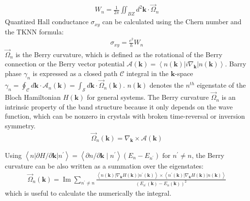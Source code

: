 \begin{align}
	W_{n}=\frac{1}{2 \pi} \iint_{B Z} d ^{2} \boldsymbol{k} \cdot \vec{\Omega}_{n}
\end{align}
Quantized Hall conductance $\sigma_{xy}$ can be calculated using the Chern number and the TKNN formula\cite{thouless1982quantized}:
\begin{align}
	\sigma_{xy}=\frac{e^2}{h}W_n
\end{align}
$\vec{\Omega}_n$ is the Berry curvature, which is defined as the rotational of the Berry connection or the
Berry vector potential $\mathcal{A}(\boldsymbol{k})=\left\langle n(\boldsymbol{k})\left|i \nabla_{\boldsymbol{k}}\right|n(\boldsymbol{k})\right\rangle
$\cite{berry1984quantal}. Barry phase $\gamma_n$ is expressed as a closed path $\mathcal{C}$ integral in the $\boldsymbol{k}$-space $\gamma_{n}=\oint_{\mathcal{C}} d \boldsymbol{k} \cdot \mathcal{A}_{n}(\boldsymbol{k})=\int_{\mathcal{S}} d \boldsymbol{k} \cdot \vec{\Omega}_{n}(\boldsymbol{k})$.
$n(\boldsymbol{k})$ denotes the $n^{th}$ eigenstate of the Bloch
Hamiltonian $H(\boldsymbol{k})$ for general systems. The Berry curvature $\vec{\Omega}_n$ is an intrinsic property of the
band structure because it only depends on the wave
function, which can be nonzero in crystals with broken time-reversal or inversion symmetry.\cite{xiao2010berry}
\begin{align}
	\vec{\Omega}_{n}(\boldsymbol{k})=\nabla_{\boldsymbol{k}} \times\mathcal{A}(\boldsymbol{k})
\end{align}

Using $\left\langle n|\partial H / \partial \boldsymbol{k}| n^{\prime}\right\rangle=\left\langle\partial n / \partial \boldsymbol{k} \mid n^{\prime}\right\rangle\left(E_{n}-E_{n^{\prime}}\right) \text { for } n^{\prime} \neq n$, the Berry curvature can be also written as a summation over the eigenstates:
\begin{align}
	\vec{\Omega}_{n}(\boldsymbol{k})=\operatorname{Im} \sum_{n^\prime \neq n} \frac{\left\langle n(\boldsymbol{k})\left|\nabla_{\boldsymbol{k}} H(\boldsymbol{k})\right| n^\prime(\boldsymbol{k})\right\rangle \times\left\langle n^\prime(\boldsymbol{k})\left|\nabla_{\boldsymbol{k}} H(\boldsymbol{k})\right| n(\boldsymbol{k})\right\rangle}{\left(E_{n^\prime}(\boldsymbol{k})-E_{n}(\boldsymbol{k})\right)^{2}}
\end{align}
which is useful to calculate the numerically the integral.\\

